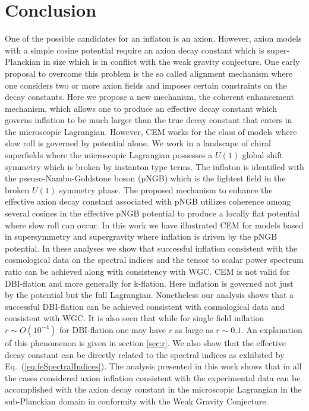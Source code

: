 \documentclass[12pt]{article}
\begin{document}
\section{Conclusion \label{sec:Conclusion}}
One of the possible candidates for an inflaton is an axion.
However, axion models with a simple cosine potential require an axion decay constant which is super-Planckian in size which is in conflict with the weak gravity conjecture.
One early proposal to overcome this problem is the so called alignment mechanism where one considers two or more axion fields and imposes certain constraints on the decay constants.
Here we propose a new mechanism, the coherent enhancement mechanism, which allows one to produce an effective decay constant which governs inflation to be much larger than the true decay constant that enters in the microscopic Lagrangian.
However, CEM works for the class of models where slow roll is governed by potential alone.
We work in a landscape of chiral superfields where the microscopic Lagrangian possesses a $U\left(1\right)$ global shift symmetry which is broken by instanton type terms.
The inflaton is identified with the pseuso-Nambu-Goldstone boson (pNGB) which is the lightest field in the broken $U\left(1\right)$ symmetry phase.
The proposed mechanism to enhance the effective axion decay constant associated with pNGB utilizes coherence among several cosines in the effective pNGB potential to produce a locally flat potential where slow roll can occur.
In this work we have illustrated CEM for models based in supersymmetry and supergravity where inflation is driven by the pNGB potential.
In these analyses we show that successful inflation consistent with the cosmological data on the spectral indices and the tensor to scalar power spectrum ratio can be achieved along with consistency with WGC.
CEM is not valid for DBI-flation and more generally for k-flation.
Here inflation is governed not just by the potential but the full Lagrangian.
Nonetheless our analysis shows that a successful DBI-flation can be achieved consistent with cosmological data and consistent with WGC.
It is also seen that while for single field inflation $r \sim O\left(10^{-4}\right)$ for DBI-flation one may have $r$ as large as $r \sim 0.1$.
An explanation of this phenomenon is given in section \ref{sec:r}.
We also show that the effective decay constant can be directly related to the spectral indices as exhibited by Eq.~(\ref{eq:feSpectralIndices}).
The analysis presented in this work shows that in all the cases considered axion inflation consistent with the experimental data can be accomplished with the axion decay constant in the microscopic Lagrangian in the sub-Planckian domain in conformity with the Weak Gravity Conjecture.\\~\\~\\
\end{document}
